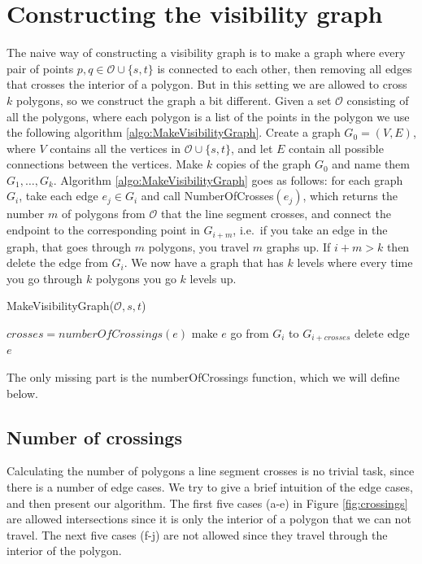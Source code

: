 \section{Constructing the visibility graph}
The naive way of constructing a visibility graph is to make a graph
where every pair of points $p,q \in \mathcal{O} \cup \{s,t\}$ is connected to each other,
then removing all edges that crosses the interior of a polygon. But in this
setting we are allowed to cross $k$ polygons, so we construct the graph a bit
different. Given a set $\mathcal{O}$ consisting of all the polygons, where each polygon
is a list of the points in the polygon we use the following algorithm \ref{algo:MakeVisibilityGraph}.  
Create a graph $G_0=(V,E)$, where $V$ contains all the vertices in $\mathcal{O}\cup \{s,t\}$,
and let $E$ contain all possible connections between the vertices. Make $k$
copies of the graph $G_0$ and name them $G_1,\dots,G_{k}$. Algorithm \ref{algo:MakeVisibilityGraph} goes as
follows: for each graph $G_i$, take each edge $e_j\in G_i$ and call
NumberOfCrosses$(e_j)$, which returns the number $m$ of polygons from $\mathcal{O}$ that the
line segment crosses, and connect the endpoint to the corresponding point in
$G_{i+m}$, i.e.\ if you take an edge in the graph, that goes through $m$
polygons, you travel $m$ graphs up. If $i+m > k$ then delete the edge from
$G_i$. We now
have a graph that has $k$ levels where every time you go through $k$ polygons
you go $k$ levels up.

\begin{algorithm} 
	\caption{MakeVisibilityGraph($\mathcal{O},s,t$)}
	\begin{algorithmic}[1]
			\State $crosses = numberOfCrossings(e)$
				\State make $e$ go from $G_i$ to $G_{i+crosses}$
			\Else
				\State delete edge $e$
			\EndIf
		\EndFor
		\EndFor
	\end{algorithmic}
	\label{algo:MakeVisibilityGraph}
\end{algorithm}

The only missing part is the numberOfCrossings function, which we will define
below.

\subsection{Number of crossings}
Calculating the number of polygons a line segment crosses is no trivial task,
since there is a number of edge cases. We try to give a brief intuition of the
edge cases, and then present our algorithm.
The first five cases (a-e) in Figure \ref{fig:crossings} are allowed intersections since
it is only the interior of a polygon that we can not travel. The
next five cases (f-j) are not allowed since they travel through the interior
of the polygon.

